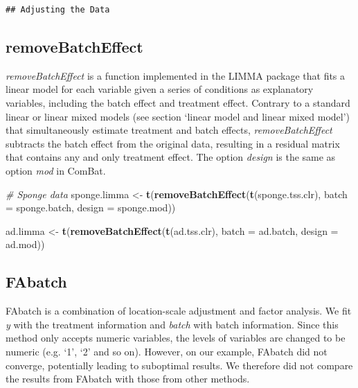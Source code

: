 \documentclass[]{book}
\newenvironment{Shaded}{\begin{snugshade}}{\end{snugshade}}
\newcommand{\KeywordTok}[1]{\textcolor[rgb]{0.13,0.29,0.53}{\textbf{#1}}}
\newcommand{\DataTypeTok}[1]{\textcolor[rgb]{0.13,0.29,0.53}{#1}}
\newcommand{\StringTok}[1]{\textcolor[rgb]{0.31,0.60,0.02}{#1}}
\newcommand{\CommentTok}[1]{\textcolor[rgb]{0.56,0.35,0.01}{\textit{#1}}}
\newcommand{\NormalTok}[1]{#1}
\begin{document}
\begin{verbatim}
## Adjusting the Data
\end{verbatim}

\subsection{removeBatchEffect}\label{removebatcheffect}

\emph{removeBatchEffect} is a function implemented in the LIMMA package
that fits a linear model for each variable given a series of conditions
as explanatory variables, including the batch effect and treatment
effect. Contrary to a standard linear or linear mixed models (see
section `linear model and linear mixed model') that simultaneously
estimate treatment and batch effects, \emph{removeBatchEffect} subtracts
the batch effect from the original data, resulting in a residual matrix
that contains any and only treatment effect. The option \emph{design} is
the same as option \emph{mod} in ComBat.

\begin{Shaded}
\begin{Highlighting}[]
\CommentTok{# Sponge data}
\NormalTok{sponge.limma <-}\StringTok{ }\KeywordTok{t}\NormalTok{(}\KeywordTok{removeBatchEffect}\NormalTok{(}\KeywordTok{t}\NormalTok{(sponge.tss.clr), }\DataTypeTok{batch =}\NormalTok{ sponge.batch, }
                                    \DataTypeTok{design =}\NormalTok{ sponge.mod))}
\end{Highlighting}
\end{Shaded}

\begin{Shaded}
\begin{Highlighting}[]
\NormalTok{ad.limma <-}\StringTok{ }\KeywordTok{t}\NormalTok{(}\KeywordTok{removeBatchEffect}\NormalTok{(}\KeywordTok{t}\NormalTok{(ad.tss.clr), }\DataTypeTok{batch =}\NormalTok{ ad.batch, }
                                \DataTypeTok{design =}\NormalTok{ ad.mod))}
\end{Highlighting}
\end{Shaded}

\subsection{FAbatch}\label{fabatch}

FAbatch is a combination of location-scale adjustment and factor
analysis. We fit \emph{y} with the treatment information and
\emph{batch} with batch information. Since this method only accepts
numeric variables, the levels of variables are changed to be numeric
(e.g. `1', `2' and so on). However, on our example, FAbatch did not
converge, potentially leading to suboptimal results. We therefore did
not compare the results from FAbatch with those from other methods.
\end{document}
